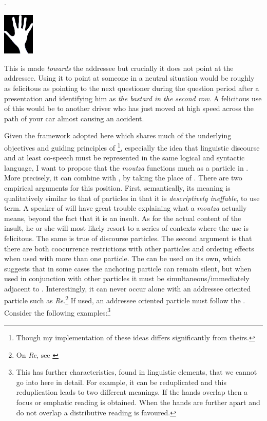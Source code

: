 \documentclass[output=paper]{LSP/langsci}
\begin{document}
\Lsciex.

\vspace*{-6mm}
\hspace*{1cm}
 \includegraphics[height=2cm]{figures/mou4.jpg}

This  is made \textit{towards} the addressee but crucially it does not point at the addressee.  Using it to point at someone in a neutral situation would be roughly as felicitous as pointing to the next questioner during the {question} period after a presentation and identifying him as \textit{the bastard in the second row}.   A felicitous use of this  would be to another driver who has just moved at high speed across the path of your car almost causing an accident. 

 Given the framework adopted here which shares much of the underlying objectives and guiding principles of \footnote{Though my implementation of these ideas differs significantly from theirs.}, especially the idea that linguistic discourse and at least co-speech  must be represented in the same logical and syntactic language, I want to propose that the \textit{moutza} functions much as a particle in .  More precisely, it can combine with \na, by taking the place of {\xspace\Pointinghand}.  There are two empirical arguments for this position.  First, semantically, its meaning is qualitatively similar to that of particles in that it is \textit{descriptively ineffable}, to use  term. 
 A speaker of  will have great trouble explaining what a \textit{moutza} actually means, beyond the fact that it is an insult. As for the actual content of the insult, he or she will most likely resort to a series of contexts where the use is felicitous.  The same is true of discourse particles.  
The second argument is that there are both coocurrence restrictions with other particles and ordering effects when used with more than one particle. The  can be used on its own, which suggests that in some cases the anchoring particle can remain silent, but when used in conjunction with other particles it must be simultaneous/immediately adjacent to \na.  Interestingly, it can never occur alone with an addressee oriented particle such as \textit{Re}.\footnote{On \textit{Re}, see \citet{tsoulas-alexiadou:06}}  
If used, an addressee oriented particle must follow the .  Consider the following examples:\footnote{This  has further characteristics, found in linguistic elements, that we cannot go into here in detail.  For example, it can be reduplicated and this reduplication leads to two different meanings.  If the hands overlap then a focus or emphatic reading is obtained.  When the hands are further apart and do not overlap a distributive reading is favoured.}
\end{document}
